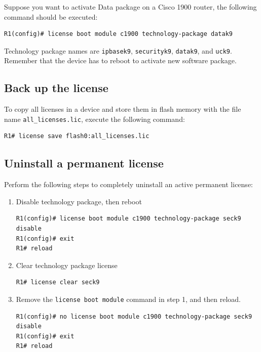 Suppose you want to activate Data package on a Cisco 1900 router, the following command should be executed:

\begin{verbatim}
R1(config)# license boot module c1900 technology-package datak9
\end{verbatim}

Technology package names are \verb|ipbasek9|, \verb|securityk9|, \verb|datak9|, and \verb|uck9|.\\

Remember that the device has to reboot to activate new software package.

\subsection{Back up the license}

To copy all licenses in a device and store them in flash memory with the file name \verb|all_licenses.lic|, execute the following command:

\begin{verbatim}
R1# license save flash0:all_licenses.lic
\end{verbatim}

\subsection{Uninstall a permanent license}

Perform the following steps to completely uninstall an active permanent license:

\begin{enumerate}
\item Disable technology package, then reboot

\begin{verbatim}
R1(config)# license boot module c1900 technology-package seck9 disable
R1(config)# exit
R1# reload
\end{verbatim}

\item Clear technology package license

\begin{verbatim}
R1# license clear seck9
\end{verbatim}

\item Remove the \verb|license boot module| command in step 1, and then reload.

\begin{verbatim}
R1(config)# no license boot module c1900 technology-package seck9 disable
R1(config)# exit
R1# reload
\end{verbatim}
\end{enumerate}